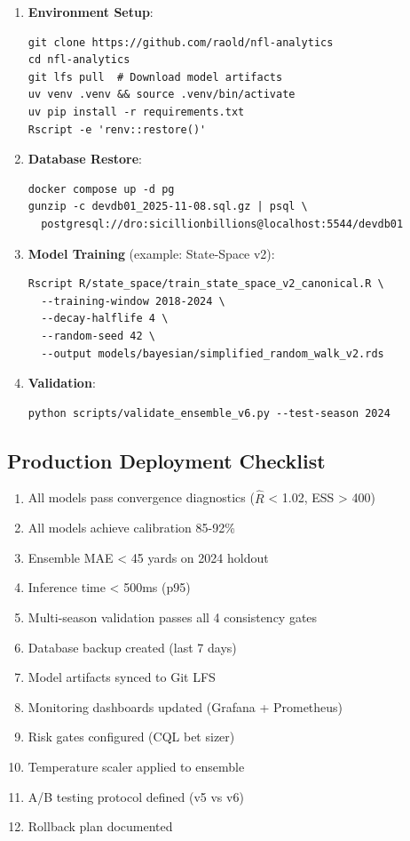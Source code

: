 \begin{enumerate}
\item \textbf{Environment Setup}:
\begin{verbatim}
git clone https://github.com/raold/nfl-analytics
cd nfl-analytics
git lfs pull  # Download model artifacts
uv venv .venv && source .venv/bin/activate
uv pip install -r requirements.txt
Rscript -e 'renv::restore()'
\end{verbatim}

\item \textbf{Database Restore}:
\begin{verbatim}
docker compose up -d pg
gunzip -c devdb01_2025-11-08.sql.gz | psql \
  postgresql://dro:sicillionbillions@localhost:5544/devdb01
\end{verbatim}

\item \textbf{Model Training} (example: State-Space v2):
\begin{verbatim}
Rscript R/state_space/train_state_space_v2_canonical.R \
  --training-window 2018-2024 \
  --decay-halflife 4 \
  --random-seed 42 \
  --output models/bayesian/simplified_random_walk_v2.rds
\end{verbatim}

\item \textbf{Validation}:
\begin{verbatim}
python scripts/validate_ensemble_v6.py --test-season 2024
\end{verbatim}
\end{enumerate}

\subsection{Production Deployment Checklist}

\begin{enumerate}
\item[$\square$] All models pass convergence diagnostics ($\hat{R}$ < 1.02, ESS > 400)
\item[$\square$] All models achieve calibration 85-92\%
\item[$\square$] Ensemble MAE < 45 yards on 2024 holdout
\item[$\square$] Inference time < 500ms (p95)
\item[$\square$] Multi-season validation passes all 4 consistency gates
\item[$\square$] Database backup created (last 7 days)
\item[$\square$] Model artifacts synced to Git LFS
\item[$\square$] Monitoring dashboards updated (Grafana + Prometheus)
\item[$\square$] Risk gates configured (CQL bet sizer)
\item[$\square$] Temperature scaler applied to ensemble
\item[$\square$] A/B testing protocol defined (v5 vs v6)
\item[$\square$] Rollback plan documented
\end{enumerate}


